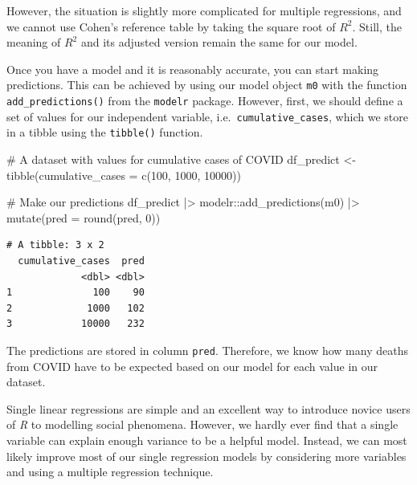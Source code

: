 \documentclass[
  letterpaper,
]{krantz}
\makeatletter
\newenvironment{Shaded}{\begin{snugshade}}{\end{snugshade}}
\newcommand{\AttributeTok}[1]{\textcolor[rgb]{0.40,0.45,0.13}{#1}}
\newcommand{\CommentTok}[1]{\textcolor[rgb]{0.37,0.37,0.37}{#1}}
\newcommand{\DecValTok}[1]{\textcolor[rgb]{0.68,0.00,0.00}{#1}}
\newcommand{\FunctionTok}[1]{\textcolor[rgb]{0.28,0.35,0.67}{#1}}
\newcommand{\NormalTok}[1]{\textcolor[rgb]{0.00,0.23,0.31}{#1}}
\newcommand{\OtherTok}[1]{\textcolor[rgb]{0.00,0.23,0.31}{#1}}
\newcommand{\SpecialCharTok}[1]{\textcolor[rgb]{0.37,0.37,0.37}{#1}}
\newenvironment{kframe}{%
\medskip{}
\setlength{\fboxsep}{.8em}
 \def\at@end@of@kframe{}%
 \ifinner\ifhmode%
  \def\at@end@of@kframe{\end{minipage}}%
  \begin{minipage}{\columnwidth}%
 \fi\fi%
 \def\FrameCommand##1{\hskip\@totalleftmargin \hskip-\fboxsep
 \colorbox{shadecolor}{##1}\hskip-\fboxsep
     \hskip-\linewidth \hskip-\@totalleftmargin \hskip\columnwidth}%
 \MakeFramed {\advance\hsize-\width
   \@totalleftmargin\z@ \linewidth\hsize
   \@setminipage}}%
 {\par\unskip\endMakeFramed%
 \at@end@of@kframe}
\renewenvironment{Shaded}{\begin{kframe}}{\end{kframe}}
\makeatother
\begin{document}
However, the situation is slightly more complicated for multiple
regressions, and we cannot use Cohen's reference table by taking the
square root of \(R^2\). Still, the meaning of \(R^2\) and its adjusted
version remain the same for our model.

Once you have a model and it is reasonably accurate, you can start
making predictions. This can be achieved by using our model object
\texttt{m0} with the function \texttt{add\_predictions()} from the
\texttt{modelr} package. However, first, we should define a set of
values for our independent variable, i.e.~\texttt{cumulative\_cases},
which we store in a tibble using the \texttt{tibble()} function.

\begin{Shaded}
\begin{Highlighting}[]
\CommentTok{\# A dataset with values for cumulative cases of COVID}
\NormalTok{df\_predict }\OtherTok{\textless{}{-}}
  \FunctionTok{tibble}\NormalTok{(}\AttributeTok{cumulative\_cases =} \FunctionTok{c}\NormalTok{(}\DecValTok{100}\NormalTok{, }\DecValTok{1000}\NormalTok{, }\DecValTok{10000}\NormalTok{))}

\CommentTok{\# Make our predictions}
\NormalTok{df\_predict }\SpecialCharTok{|\textgreater{}}
\NormalTok{  modelr}\SpecialCharTok{::}\FunctionTok{add\_predictions}\NormalTok{(m0) }\SpecialCharTok{|\textgreater{}}
  \FunctionTok{mutate}\NormalTok{(}\AttributeTok{pred =} \FunctionTok{round}\NormalTok{(pred, }\DecValTok{0}\NormalTok{))}
\end{Highlighting}
\end{Shaded}

\begin{verbatim}
# A tibble: 3 x 2
  cumulative_cases  pred
             <dbl> <dbl>
1              100    90
2             1000   102
3            10000   232
\end{verbatim}

The predictions are stored in column \texttt{pred}. Therefore, we know
how many deaths from COVID have to be expected based on our model for
each value in our dataset.

Single linear regressions are simple and an excellent way to introduce
novice users of \emph{R} to modelling social phenomena. However, we
hardly ever find that a single variable can explain enough variance to
be a helpful model. Instead, we can most likely improve most of our
single regression models by considering more variables and using a
multiple regression technique.
\end{document}
